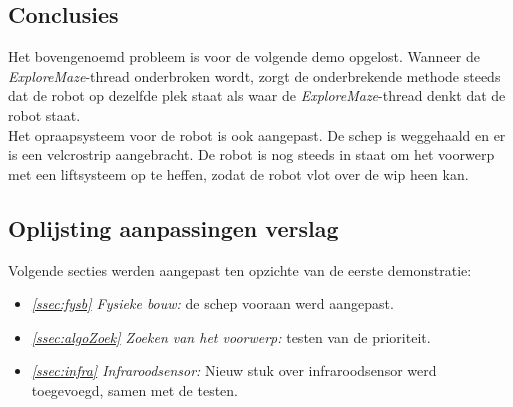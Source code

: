\documentclass[tt2]{penoverslag}
\begin{document}
\subsection{Conclusies} %
\label{Assec:conc1}
Het bovengenoemd probleem is voor de volgende demo opgelost. Wanneer de \textit{ExploreMaze}-thread onderbroken wordt, zorgt de onderbrekende methode steeds dat de robot op dezelfde plek staat als waar de \textit{ExploreMaze}-thread denkt dat de robot staat.\\
Het opraapsysteem voor de robot is ook aangepast. De schep is weggehaald en er is een velcrostrip aangebracht. De robot is nog steeds in staat om het voorwerp met een liftsysteem op te heffen, zodat de robot vlot over de wip heen kan.


\subsection{Oplijsting aanpassingen verslag} %
\label{Assec:aanp1}
Volgende secties werden aangepast ten opzichte van de eerste demonstratie:

\begin{itemize}
\item \textit{\ref{ssec:fysb} Fysieke bouw:} de schep vooraan werd aangepast.
\item \textit{\ref{ssec:algoZoek} Zoeken van het voorwerp:} testen van de prioriteit.
\item \textit{\ref{ssec:infra} Infraroodsensor:} Nieuw stuk over infraroodsensor werd toegevoegd, samen met de testen.
\end{itemize}

\newpage
\end{document}
